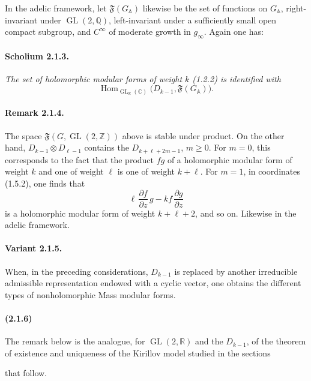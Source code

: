 \documentclass[10pt,a4paper]{article}
\providecommand{\GL}{\operatorname{GL}}
\providecommand{\Hom}{\operatorname{Hom}}
\providecommand{\R}{\mathbb R}
\providecommand{\Q}{\mathbb Q}
\providecommand{\Z}{\mathbb Z}
\providecommand{\C}{\mathbb C}
\begin{document}
In the adelic framework, let \(\mathfrak F(G_{\mathbb A})\) likewise be the set of functions on \(G_{\mathbb A}\), right-invariant under \(\GL(2,\Q)\), left-invariant under a sufficiently small open compact subgroup, and \(C^\infty\) of moderate growth in \(g_\infty\). Again one has:

\paragraph{Scholium 2.1.3.}{\itshape  The set of holomorphic modular forms of weight \(k\) (1.2.2) is identified with
\[
\Hom_{\GL_{\R}(\C)}\bigl(D_{k-1},\mathfrak F(G_{\mathbb A})\bigr).
\]

\par}
\paragraph{Remark 2.1.4.} The space \(\mathfrak F(G,\GL(2,\Z))\) above is stable under product. On the other hand, \(D_{k-1}\otimes D_{\ell-1}\) contains the \(D_{k+\ell+2m-1}\), \(m\ge0\). For \(m=0\), this corresponds to the fact that the product \(fg\) of a holomorphic modular form of weight \(k\) and one of weight \(\ell\) is one of weight \(k+\ell\). For \(m=1\), in coordinates (1.5.2), one finds that
\[
\ell\,\frac{\partial f}{\partial z}\,g-kf\,\frac{\partial g}{\partial z}
\]
is a holomorphic modular form of weight \(k+\ell+2\), and so on. Likewise in the adelic framework.

\paragraph{Variant 2.1.5.} When, in the preceding considerations, \(D_{k-1}\) is replaced by another irreducible admissible representation endowed with a cyclic vector, one obtains the different types of nonholomorphic Mass modular forms.

\paragraph{(2.1.6)} The remark below is the analogue, for \(\GL(2,\R)\) and the \(D_{k-1}\), of the theorem of existence and uniqueness of the Kirillov model studied in the sections

\clearpage
{}
\hypertarget{authority-24}{}
that follow.
\end{document}
